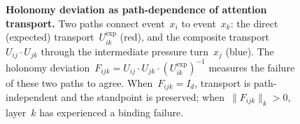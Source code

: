 \begin{figure}[t]
\caption{%
    \textbf{Holonomy deviation as path-dependence of attention transport.}
    Two paths connect event~$x_i$ to event~$x_k$: the direct (expected) transport~$U_{ik}^{\exp}$
    (red), and the composite transport~$U_{ij} \cdot U_{jk}$ through the intermediate
    pressure turn~$x_j$ (blue).
    The holonomy deviation~$F_{ijk} = U_{ij} \cdot U_{jk} \cdot (U_{ik}^{\exp})^{-1}$
    measures the failure of these two paths to agree.
    When~$F_{ijk} = I_d$, transport is path-independent and the standpoint is preserved;
    when~$\|F_{ijk}\|_k > 0$, layer~$k$ has experienced a binding failure.
}
\label{fig:attention-transport}
\end{figure}
